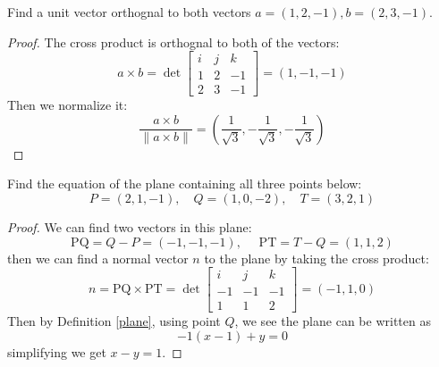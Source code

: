 \documentclass[openany]{book}
\begin{document}
\begin{prob}
    Find a unit vector orthognal to both vectors $a=(1,2,-1), b=(2,3,-1)$.
\end{prob}
\begin{proof}
    The cross product is orthognal to both of the vectors:
    \begin{equation*}
        a\times b=\det\begin{bmatrix}
            i&j&k\\
            1&2&-1\\
            2&3&-1
        \end{bmatrix}=(1,-1, -1)
    \end{equation*}
    Then we normalize it:
    \begin{equation*}
        \frac{a\times b}{\|a\times b\|}=\left(\frac{1}{\sqrt{3}}, -\frac{1}{\sqrt{3}}, -\frac{1}{\sqrt{3}}\right)
    \end{equation*}
\end{proof}


\begin{prob}
    Find the equation of the plane containing all three points below:
    \begin{equation*}
        P=(2,1,-1), \quad Q=(1,0,-2), \quad T=(3,2,1)
    \end{equation*}
\end{prob}
\begin{proof}
    We can find two vectors in this plane:
    \begin{equation*}
        \text{PQ}=Q-P=(-1,-1,-1), \quad \text{ PT}=T-Q=(1,1,2)
    \end{equation*}
    then we can find a normal vector $n$ to the plane by taking the cross product:
    \begin{equation*}
        n=\text{PQ}\times\text{PT}=\det\begin{bmatrix}
            i&j&k\\
            -1&-1&-1\\
            1&1&2
        \end{bmatrix}=(-1,1,0)
    \end{equation*}
    Then by Definition \ref{plane}, using point $Q$, we see the plane can be written as 
    \begin{equation*}
        -1(x-1)+y=0
    \end{equation*}
    simplifying we get $x-y=1$.
\end{proof}
\end{document}
